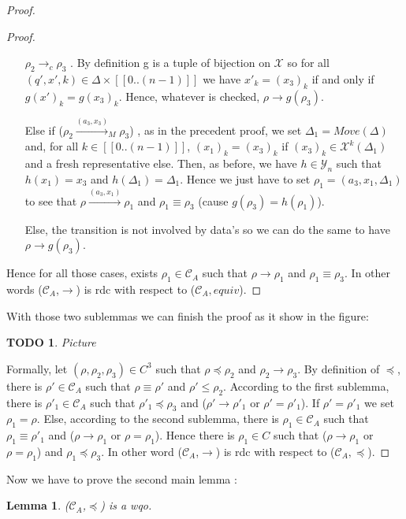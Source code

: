 \documentclass[a4paper,10pt]{report}
\newtheorem{lm}{Lemma}[thr]
\newtheorem{td}{TODO}
\newcommand{\seg}[1]{[\![#1]\!]}
\newcommand{\ts}{\seg{0 .. (n-1)}}
\newcommand{\C}{\mathcal{C}_{A}}
\newcommand{\Xa}{\mathcal{X}}
\newcommand{\Y}{\mathcal{Y}_{n}}
\begin{document}
\begin{proof}
\begin{proof}
    \begin{itemize}
    \item [$\rho_2 \rightarrow_{c} \rho_3$]. By definition g is a tuple of bijection on $\Xa$ so for all $(q',x',k) \in \Delta \times \ts$ we have 
    $x'_k = (x_3)_k$ if and only if  $g(x')_k = {g(x_3)}_k$. Hence, whatever is checked, $\rho \rightarrow g(\rho_3)$.  
    \item [Else if ($\rho_2 \xrightarrow{(a_3,x_3)}_{M} \rho_3$)], as in the precedent proof, we set $\Delta_1 = Move(\Delta)$ and, for all $k \in \ts$, ${(x_1)}_k = {(x_3)}_k$ if ${(x_3)}_k \in \Xa^k(\Delta_1)$ and a fresh representative else.
     Then, as before, we have $h \in \Y$ such that $h(x_1) = x_3$ and $h(\Delta_1) = \Delta_1$.
     Hence we just have to set $\rho_1 = (a_3,x_1,\Delta_1)$ to see that $\rho \xrightarrow{(a_3,x_1)} \rho_1$ and $\rho_1 \equiv \rho_3$ (cause $g(\rho_3) = h(\rho_1)$).
    \item [Else,] the transition is not involved by data's so we can do the same to have $\rho \rightarrow g(\rho_3)$.
    \end{itemize}
    Hence for all those cases, exists $\rho_1 \in \C$ such that $\rho \xrightarrow{} \rho_1$ and $\rho_1 \equiv \rho_3$. 
    In other words ($\C$,$\rightarrow$) is rdc with respect to ($\C,equiv$).
  \end{proof}
  With those two sublemmas we can finish the proof as it show in the figure: 
  \begin{td} 
   Picture
  \end{td}
  Formally, let $(\rho,\rho_2,\rho_3) \in C^3 $ such that $ \rho \preceq \rho_2 $ and $ \rho_2 \rightarrow \rho_3$.
  By definition of $\preceq$, there is $\rho' \in \C$ such that $\rho \equiv \rho'$ and $\rho' \leq \rho_2$.
  According to the first sublemma, there is $\rho'_1 \in \C$ such that $\rho'_1 \preceq \rho_3$ and ($\rho' \rightarrow \rho'_1$ or $\rho' = \rho'_1$).
  If $\rho' = \rho'_1$ we set $\rho_1 = \rho$.
  Else, according to the second sublemma, there is $\rho_1 \in \C$ such that $\rho_1 \equiv \rho'_1$ and ($\rho \rightarrow \rho_1$ or $\rho =\rho_1$).
  Hence there is $\rho_1 \in C $ such that ($\rho \rightarrow \rho_1$ or $\rho = \rho_1$) and $\rho_1 \preceq \rho_3$.
  In other word ($\C$,$\rightarrow$) is rdc with respect to ($\C,\preceq$).

\end{proof}

Now we have to prove the second main lemma :

\begin{lm} \label{cd1}
  ($\C$,$\preceq$) is a wqo.
\end{lm}
\end{document}
